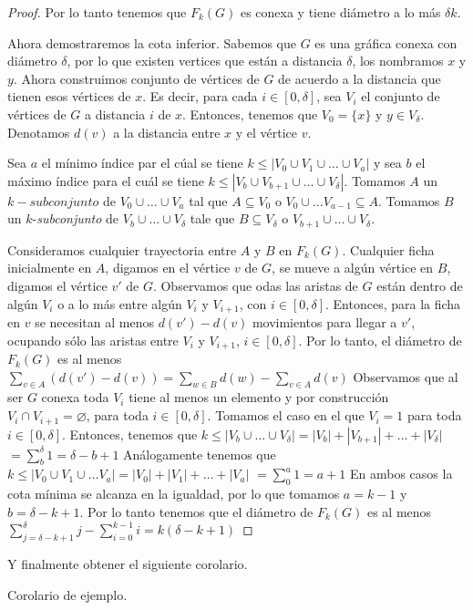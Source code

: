 \begin{proof}
Por lo tanto tenemos que $F_{k}(G)$ es conexa y tiene di\'ametro a lo m\'as 
$\delta k$.

Ahora demostraremos la cota inferior. Sabemos que $G$ es una gr\'afica conexa 
con di\'ametro $\delta$, por lo que existen vertices que est\'an a distancia 
$\delta$, los nombramos $x$ y $y$. Ahora construimos conjunto de v\'ertices de 
$G$ de acuerdo a la distancia que tienen esos v\'ertices de $x$. Es decir, para
cada $i\in [0,\delta]$, sea $V_{i}$ el conjunto de v\'ertices de $G$ a 
distancia $i$ de $x$. Entonces, tenemos que $V_{0}=\{x\}$ y $y\in V_{\delta}$.
Denotamos $d(v)$ a la distancia entre $x$ y el v\'ertice $v$.

Sea $a$ el m\'inimo \'indice par el c\'ual se tiene 
$k \leq |V_{0}\cup V_{1}\cup \dots \cup V_{a}|$ y sea $b$ el m\'aximo \'indice 
para el cu\'al se tiene $k\leq |V_{b}\cup V_{b+1}\cup \dots \cup V_{\delta}|$.
Tomamos $A$ un $k-subconjunto$ de $V_{0}\cup \dots \cup V_{a}$  tal que $A\subseteq V_{0}$
o $V_{0}\cup \dots V_{a-1}\subseteq A$. Tomamos $B$ un $k$-\textit{subconjunto} de
$V_{b}\cup \dots \cup V_{\delta}$ tale que $B\subseteq V_{\delta}$ o 
$V_{b+1}\cup \dots \cup V_{\delta}$. 

Consideramos cualquier trayectoria entre $A$ y $B$ en $F_{k}(G)$. Cualquier 
ficha inicialmente en $A$, digamos en el v\'ertice $v$ de $G$, se mueve a
alg\'un v\'ertice en $B$, digamos el v\'ertice $v'$ de $G$. Observamos que
odas las aristas de $G$ est\'an dentro de alg\'un $V_{i}$ o a lo m\'as entre 
alg\'un $V_{i}$ y $V_{i+1}$, con $i\in[0,\delta]$. Entonces, para la ficha en 
$v$ se necesitan al menos $d(v')-d(v)$ movimientos para llegar a $v'$, 
ocupando s\'olo las aristas entre $V_{i}$ y $V_{i+1}$, $i\in [0,\delta]$.
Por lo tanto, el di\'ametro de $F_{k}(G)$ es al menos 
    $\sum_{v\in A}(d(v')-d(v))= \sum_{w\in B}d(w)-\sum_{v\in A}d(v)$
Observamos que al ser $G$ conexa toda $V_{i}$ tiene al menos un elemento 
y por construcci\'on $V_{i} \cap V_{i+1}=\varnothing$, para toda $i\in [0,\delta]$. 
Tomamos el caso en el que $V_{i}=1$ para toda $i\in [0,\delta]$. Entonces, 
tenemos que 
    $k\leq |V_{b}\cup\dots\cup V_{\delta}|=|V_{b}|+|V_{b+1}|+\dots +|V_\delta|$
    $=\sum_{b}^{\delta}1 = \delta -b+1$
An\'alogamente tenemos que 
    $k\leq |V_{0}\cup V_{1}\cup \dots V_{a}|=|V_{0}|+|V_{1}|+\dots + |V_{a}|$
    $=\sum_{0}^{a} 1 = a+1$
En ambos casos la cota m\'inima se alcanza en la igualdad, por lo que tomamos 
$a=k-1$ y $b=\delta-k+1$. Por lo tanto tenemos que el di\'ametro de $F_{k}(G)$
es al menos
    $\sum_{j=\delta -k+1}^{\delta}j - \sum_{i=0}^{k-1}i = k(\delta-k+1)$
\end{proof}

Y finalmente obtener el siguiente corolario.

\begin{corolario}%
\label{cor:ejemplo}
Corolario de ejemplo.
\end{corolario}
